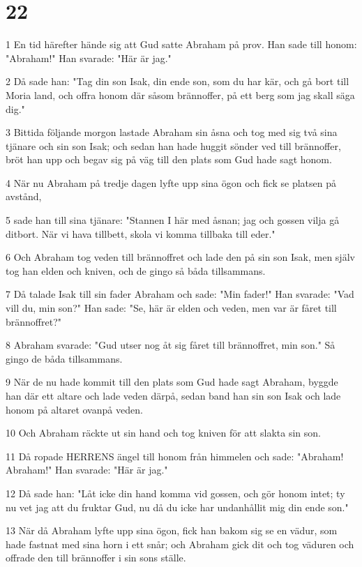 \chapter{22}

\par 1 En tid härefter hände sig att Gud satte Abraham på prov. Han sade till honom: "Abraham!" Han svarade: "Här är jag."
\par 2 Då sade han: "Tag din son Isak, din ende son, som du har kär, och gå bort till Moria land, och offra honom där såsom brännoffer, på ett berg som jag skall säga dig."
\par 3 Bittida följande morgon lastade Abraham sin åsna och tog med sig två sina tjänare och sin son Isak; och sedan han hade huggit sönder ved till brännoffer, bröt han upp och begav sig på väg till den plats som Gud hade sagt honom.
\par 4 När nu Abraham på tredje dagen lyfte upp sina ögon och fick se platsen på avstånd,
\par 5 sade han till sina tjänare: "Stannen I här med åsnan; jag och gossen vilja gå ditbort. När vi hava tillbett, skola vi komma tillbaka till eder."
\par 6 Och Abraham tog veden till brännoffret och lade den på sin son Isak, men själv tog han elden och kniven, och de gingo så båda tillsammans.
\par 7 Då talade Isak till sin fader Abraham och sade: "Min fader!" Han svarade: "Vad vill du, min son?" Han sade: "Se, här är elden och veden, men var är fåret till brännoffret?"
\par 8 Abraham svarade: "Gud utser nog åt sig fåret till brännoffret, min son." Så gingo de båda tillsammans.
\par 9 När de nu hade kommit till den plats som Gud hade sagt Abraham, byggde han där ett altare och lade veden därpå, sedan band han sin son Isak och lade honom på altaret ovanpå veden.
\par 10 Och Abraham räckte ut sin hand och tog kniven för att slakta sin son.
\par 11 Då ropade HERRENS ängel till honom från himmelen och sade: "Abraham! Abraham!" Han svarade: "Här är jag."
\par 12 Då sade han: "Låt icke din hand komma vid gossen, och gör honom intet; ty nu vet jag att du fruktar Gud, nu då du icke har undanhållit mig din ende son."
\par 13 När då Abraham lyfte upp sina ögon, fick han bakom sig se en vädur, som hade fastnat med sina horn i ett snår; och Abraham gick dit och tog väduren och offrade den till brännoffer i sin sons ställe.
